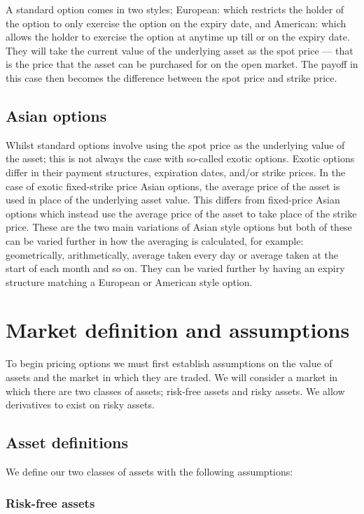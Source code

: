 A standard option comes in two styles; European: which restricts the holder of the option to only exercise the option on the expiry date, and American: which allows the holder to exercise the option at anytime up till or on the expiry date. They will take the current value of the underlying asset as the spot price --- that is the price that the asset can be purchased for on the open market. The payoff in this case then becomes the difference between the spot price and strike price.

\subsection{Asian options}

Whilst standard options involve using the spot price as the underlying value of the asset; this is not always the case with so-called exotic options. Exotic options differ in their payment structures, expiration dates, and/or strike prices. In the case of exotic fixed-strike price Asian options, the average price of the asset is used in place of the underlying asset value. This differs from fixed-price Asian options which instead use the average price of the asset to take place of the strike price. These are the two main variations of Asian style options but both of these can be varied further in how the averaging is calculated, for example: geometrically, arithmetically, average taken every day or average taken at the start of each month and so on. They can be varied further by having an expiry structure matching a European or American style option.

\section{Market definition and assumptions}

To begin pricing options we must first establish assumptions on the value of assets and the market in which they are traded. We will consider a market in which there are two classes of assets; risk-free assets and risky assets. We allow derivatives to exist on risky assets.

\subsection{Asset definitions}

We define our two classes of assets with the following assumptions:

\subsubsection{Risk-free assets}


